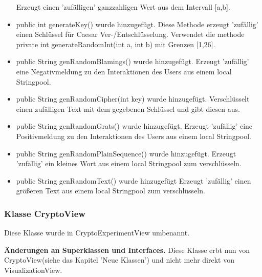 \documentclass{article}
\begin{document}
\begin{itemize}
                   Erzeugt einen 'zufälligen' ganzzahligen Wert aus dem Intervall [a,b].
             \item public int generateKey() wurde hinzugefügt.\newline
                   Diese Methode erzeugt 'zufällig' einen Schlüssel für Caesar Ver-/Entschlüsselung.
                   Verwendet die methode private int generateRandomInt(int a, int b) mit Grenzen [1,26].
             \item public String genRandomBlamings() wurde hinzugefügt.\newline
                   Erzeugt 'zufällig' eine Negativmeldung zu den Interaktionen des Users
                   aus einem local Stringpool.  
             \item public String genRandomCipher(int key) wurde hinzugefügt.\newline
                   Verschlüsselt einen zufälligen Text mit dem gegebenen Schlüssel 
                   und gibt diesen aus.
             \item public String genRandomGrats() wurde hinzugefügt.\newline
                   Erzeugt 'zufällig' eine Positivmeldung zu den Interaktionen des Users
                   aus einem local Stringpool. 
             \item public String genRandomPlainSequence() wurde hinzugefügt.\newline
                   Erzeugt 'zufällig' ein kleines Wort aus einem local Stringpool zum verschlüsseln. 
             \item public String genRandomText() wurde hinzugefügt\newline
                   Erzeugt 'zufällig' einen größeren Text aus einem local Stringpool zum verschlüsseln.      
            \end{itemize}

	\subsubsection{Klasse CryptoView}
	 Diese Klasse wurde in CryptoExperimentView umbenannt.\newline
	 
	 \textbf{Änderungen an Superklassen und Interfaces.}\newline
	     Diese Klasse erbt nun von CryptoView(siehe das Kapitel 'Neue Klassen') und nicht mehr direkt von VisualizationView.\newline
	   
\end{document}

